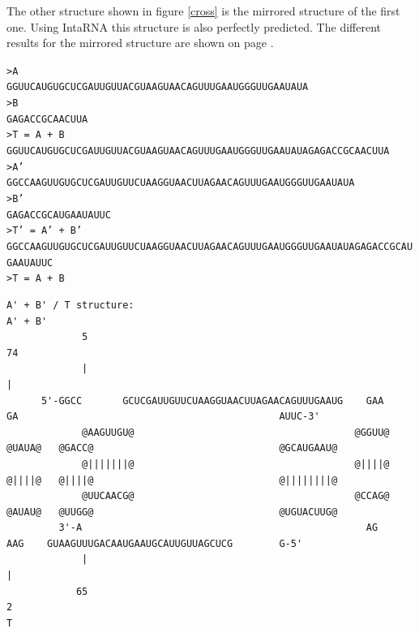 \documentclass[11pt,a4paper]{report}
\begin{document}
The other structure shown in figure \ref{cross} is the mirrored structure of the first one. Using IntaRNA this structure is also perfectly predicted. The different results for the mirrored structure are shown on page \pageref{Result:mirror}.\\
\begin{landscape}
\begin{spacing}{0.5}
\noindent
{\tiny\texttt{>A}\\
\texttt{GGUUCAUGUGCUCGAUUGUUACGUAAGUAACAGUUUGAAUGGGUUGAAUAUA}\\
\texttt{>B}\\
\texttt{GAGACCGCAACUUA}\\
\texttt{>T = A + B}\\
\texttt{GGUUCAUGUGCUCGAUUGUUACGUAAGUAACAGUUUGAAUGGGUUGAAUAUAGAGACCGCAACUUA}\\
\texttt{>A'}\\
\texttt{GGCCAAGUUGUGCUCGAUUGUUCUAAGGUAACUUAGAACAGUUUGAAUGGGUUGAAUAUA}\\
\texttt{>B'}\\
\texttt{GAGACCGCAUGAAUAUUC}\\
\texttt{>T' = A' + B'}\\
\texttt{GGCCAAGUUGUGCUCGAUUGUUCUAAGGUAACUUAGAACAGUUUGAAUGGGUUGAAUAUAGAGACCGCAUGAAUAUUC}\\
\texttt{>T = A + B}}\\
\end{spacing}
\begin{lstlisting}[style=base]
A' + B' / T structure:
A' + B'
             5                                                                                                     74
             |                                                                                                     |
      5'-GGCC       GCUCGAUUGUUCUAAGGUAACUUAGAACAGUUUGAAUG    GAA    GA                                             AUUC-3'
             @AAGUUGU@                                      @GGUU@   @UAUA@   @GACC@                                @GCAUGAAU@
             @|||||||@                                      @||||@   @||||@   @||||@                                @||||||||@
             @UUCAACG@                                      @CCAG@   @AUAU@   @UUGG@                                @UGUACUUG@
         3'-A                                                 AG     AAG    GUAAGUUUGACAAUGAAUGCAUUGUUAGCUCG        G-5'
             |                                                                                                     |
            65                                                                                                     2
T


\end{lstlisting}
\end{landscape}
\end{document}
